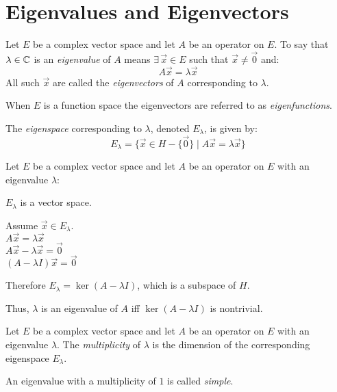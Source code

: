 \documentclass[letterpaper,12pt,fleqn]{article}
\renewcommand{\l}{\lambda}
\newcommand{\vx}{\vec{x}}
\newcommand{\vo}{\vec{0}}
\begin{document}
\section*{Eigenvalues and Eigenvectors}

\begin{definition}[Eigenvalue]
  Let $E$ be a complex vector space and let $A$ be an operator on $E$. To say
  that $\l\in\C$ is an \emph{eigenvalue} of $A$ means $\exists\,\vx\in E$ such
  that $\vx\ne\vo$ and:
  \[A\vx=\l\vx\]
  All such $\vx$ are called the \emph{eigenvectors} of $A$ corresponding to
  $\l$.

  When $E$ is a function space the eigenvectors are referred to as
  \emph{eigenfunctions}.

  The \emph{eigenspace} corresponding to $\l$, denoted $E_{\l}$, is given by:
  \[E_{\l}=\{\vx\in H-\{\vo\}\mid A\vx=\l\vx\}\]
\end{definition}

\begin{theorem}
  Let $E$ be a complex vector space and let $A$ be an operator on $E$ with
  an eigenvalue $\l$:

  \qquad$E_{\l}$ is a vector space.
\end{theorem}

\begin{theproof}
  Assume $\vx\in E_{\l}$. \\
  $A\vx=\l\vx$ \\
  $A\vx-\l\vx=\vo$ \\
  $(A-\l I)\vx=\vo$
  
  Therefore $E_{\l}=\ker(A-\l I)$, which is a subspace of $H$.
\end{theproof}

Thus, $\l$ is an eigenvalue of $A$ iff $\ker(A-\l I)$ is nontrivial.

\begin{definition}[Multiplicity]
  Let $E$ be a complex vector space and let $A$ be an operator on $E$ with
  an eigenvalue $\l$. The \emph{multiplicity} of $\l$ is the dimension of
  the corresponding eigenspace $E_{\l}$.

  An eigenvalue with a multiplicity of $1$ is called \emph{simple}.
\end{definition}
\end{document}
